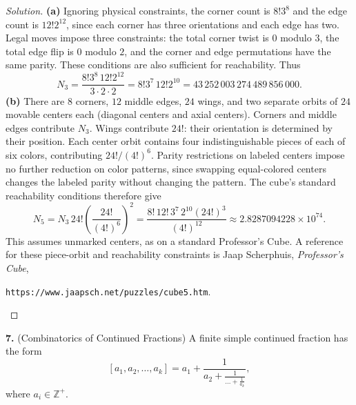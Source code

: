 \documentclass[12pt]{amsart}
\newenvironment{solution}
{\begin{proof}[Solution]}
{\end{proof}}
\begin{document}
\begin{onehalfspace}
\begin{solution}
            \textbf{(a)} Ignoring physical constraints, the corner count is
            $8!3^8$ and the edge count is $12!2^{12}$, since each corner
            has three orientations and each edge has two. Legal moves
            impose three constraints: the total corner twist is $0$
            modulo $3$, the total edge flip is $0$ modulo $2$, and the
            corner and edge permutations have the same parity. These
            conditions are also sufficient for reachability. Thus
            \[
                N_3=\frac{8!3^8\,12!2^{12}}{3\cdot2\cdot2}
                =8!3^7\,12!2^{10}
                =43\,252\,003\,274\,489\,856\,000.
            \]
            \textbf{(b)} There are $8$ corners, $12$ middle edges, $24$
            wings, and two separate orbits of $24$ movable centers each
            (diagonal centers and axial centers). Corners and middle
            edges contribute $N_3$. Wings contribute $24!$: their
            orientation is determined by their position. Each center
            orbit contains four indistinguishable pieces of each of
            six colors, contributing $24!/(4!)^6$. Parity restrictions
            on labeled centers impose no further reduction on color
            patterns, since swapping equal-colored centers changes
            the labeled parity without changing the pattern.
            The cube's standard reachability conditions therefore give
            \[
                \boxed{N_5=N_3\,24!\left(\frac{24!}{(4!)^6}\right)^2
                =\frac{8!\,12!\,3^7\,2^{10}(24!)^3}{(4!)^{12}}
                \approx 2.8287094228\times10^{74}.}
            \]
            This assumes unmarked centers, as on a standard Professor's Cube.
            A reference for these piece-orbit and reachability constraints
            is Jaap Scherphuis, \emph{Professor's Cube},
            \begin{center}
                \texttt{https://www.jaapsch.net/puzzles/cube5.htm}.
            \end{center}
        \end{solution}

        \noindent\textbf{7.} (Combinatorics of Continued Fractions) A finite simple continued fraction
        has the form
        \[
            [a_1,a_2,\ldots,a_k] = a_1 + \frac{1}{a_2 + \frac{1}{\ldots + \frac{1}{a_k}}},
        \]
        where $a_i\in\mathbb{Z}^+$.


\end{onehalfspace}
\end{document}
